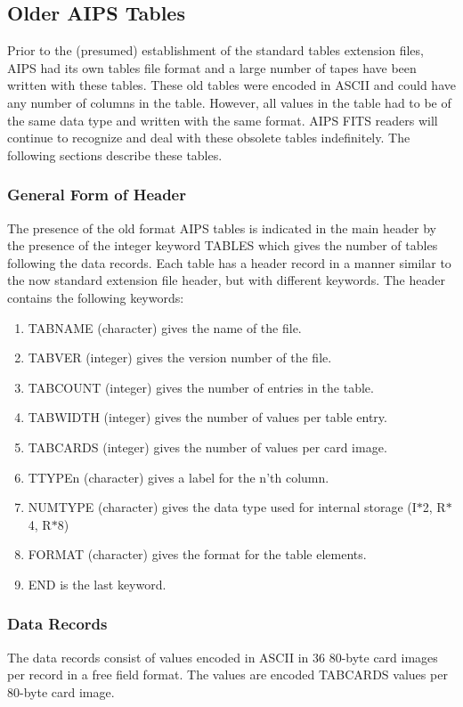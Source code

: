 \subsection{Older AIPS Tables }
Prior to the (presumed) establishment of the standard tables extension
files, AIPS had its own tables file format and a large number of tapes
have been written with these tables.  These old tables were encoded in
ASCII and could have any number of columns in the table.  However, all
values in the table had to be of the same data type and written with
the same format. AIPS FITS readers will continue to recognize and deal
with these obsolete tables indefinitely.  The following sections
describe these tables.

\subsubsection{General Form of Header }
The presence of the old format AIPS tables is indicated in the main
header by the presence of the integer keyword TABLES which gives the
number of tables following the data records.  Each table has a header
record in a manner similar to the now standard extension file header,
but with different keywords.  The header contains the following
keywords:
\begin{enumerate} %
\item TABNAME (character) gives the name of the file.
\item TABVER (integer) gives the version number of the file.
\item TABCOUNT (integer) gives the number of entries in the table.
\item TABWIDTH (integer) gives the number of values per table entry.
\item TABCARDS (integer) gives the number of values per card image.
\item TTYPEn (character) gives a label for the n'th column.
\item NUMTYPE (character) gives the data type used for internal storage
(I$\ast$2, R$\ast$4, R$\ast$8)
\item FORMAT (character) gives the format for the table elements.
\item END is the last keyword.

\end{enumerate} %
\subsubsection{Data Records }
The data records consist of values encoded in ASCII in
36 80-byte card images per record in a free field format.  The values
are encoded TABCARDS values per 80-byte card image.

